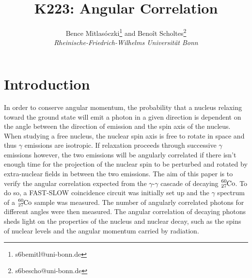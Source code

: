 \documentclass[twocolumn]{article}
\title{\textbf{K223: Angular Correlation}}
\author{Bence Mitlasóczki\thanks{s6bemitl@uni-bonn.de} and Beno\^it Scholtes\thanks{s6bescho@uni-bonn.de} \\ \textit{Rheinische-Friedrich-Wilhelms Universit\"at Bonn}}
\begin{document}
\renewcommand{\abstractname}{\vspace{-\baselineskip}} %
\twocolumn[ %
\begin{@twocolumnfalse}
\maketitle
\begin{abstract} \vspace{-10mm}
This paper analyses the angular correlation between subsequent photon emissions in the $\gamma$-$\gamma$ cascade of decaying $\ce{_27^{60}Co}$. A fast-slow coincidence circuit with scintillation detectors, single channel analysers, and constant fraction discriminators were used measure the number of $\gamma$-$\gamma$ cascade decays for angular separations from 90$^\circ$ to 270$^\circ$. The data was corrected for the measured accidental coincidences. The data was in agreement with the theoretical angular correlation function and its coefficients. The fit coefficient values calculated are $B = 0.116  \pm 0.066 $ and $C = 0.040 \pm 0.075$. The large uncertainty is to be expected from previous experiments.
\end{abstract}
\end{@twocolumnfalse}
\hspace{5mm} ]
\maketitle
\saythanks %
\section{Introduction}
In order to conserve angular momentum, the probability that a nucleus relaxing toward the ground state will emit a photon in a given direction is dependent on the angle between the direction of emission and the spin axis of the nucleus.\cite{sieg} When studying a free nucleus, the nuclear spin axis is free to rotate in space and thus $\gamma$ emissions are isotropic. If relaxation proceeds through successive $\gamma$ emissions however, the two emissions will be angularly correlated if there isn't enough time for the projection of the nuclear spin to be perturbed and rotated by extra-nuclear fields in between the two emissions. The aim of this paper is to verify the angular correlation expected from the $\gamma$-$\gamma$ cascade of decaying $\ce{_27^{60}Co}$. To do so, a FAST-SLOW coincidence circuit was initially set up and the $\gamma$ spectrum of a $\ce{_27^{60}Co}$ sample was measured. The number of angularly correlated photons for different angles were then measured. The angular correlation of decaying photons sheds light on the properties of the nucleus and nuclear decay, such as the spins of nuclear levels and the angular momentum carried by radiation. 
\end{document}
